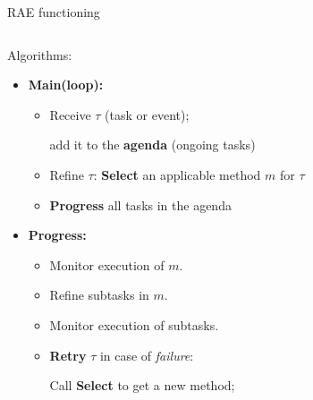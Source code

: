 \begin{frame}{RAE functioning}
    \begin{columns}[T]
  
        \begin{column}{0.65\textwidth}
            
            Algorithms:
            \small
            \begin{itemize}
                \setlength{\leftmargini}{-1pt}
                \item \textbf{Main(loop):} 
                \begin{itemize}
                    \item Receive $\tau$ (task or event);
                    
                    add it to the \textbf{agenda} (ongoing tasks)
                    \item Refine $\tau$: \textbf{Select} an applicable method $m$ for $\tau$
                    \item \textbf{Progress} all tasks in the agenda
                \end{itemize}
                \item \textbf{Progress:}
                    \begin{itemize}
                        \item Monitor execution of $m$.
                        \item Refine subtasks in $m$.    
                        \item Monitor execution of subtasks.
                        \item \textbf{Retry} $\tau$ in case of \emph{failure}:
                    
                    Call \textbf{Select} to get a new method;
                    

\end{itemize}
\end{itemize}
\end{column}
\end{columns}
\end{frame}
